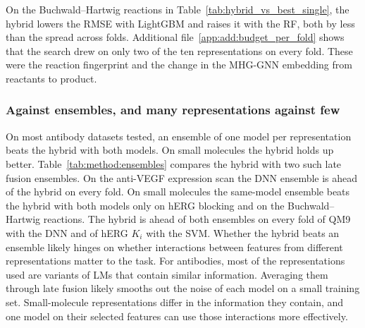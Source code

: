 On the Buchwald--Hartwig reactions in Table~\ref{tab:hybrid_vs_best_single}, the hybrid lowers the RMSE with LightGBM and raises it with the RF, both by less than the spread across folds. Additional file~\ref{app:add:budget_per_fold} shows that the search drew on only two of the ten representations on every fold. These were the reaction fingerprint and the change in the MHG-GNN embedding from reactants to product. 

\subsubsection{Against ensembles, and many representations against few}\label{sec:method:results_ensembles}

On most antibody datasets tested, an ensemble of one model per representation beats the hybrid with both models. On small molecules the hybrid holds up better. Table~\ref{tab:method:ensembles} compares the hybrid with two such late fusion ensembles. On the anti-VEGF expression scan the DNN ensemble is ahead of the hybrid on every fold. On small molecules the same-model ensemble beats the hybrid with both models only on hERG blocking and on the Buchwald--Hartwig reactions. The hybrid is ahead of both ensembles on every fold of QM9 with the DNN and of hERG $K_i$ with the SVM. Whether the hybrid beats an ensemble likely hinges on whether interactions between features from different representations matter to the task. For antibodies, most of the representations used are variants of LMs that contain similar information. Averaging them through late fusion likely smooths out the noise of each model on a small training set. Small-molecule representations differ in the information they contain, and one model on their selected features can use those interactions more effectively.


